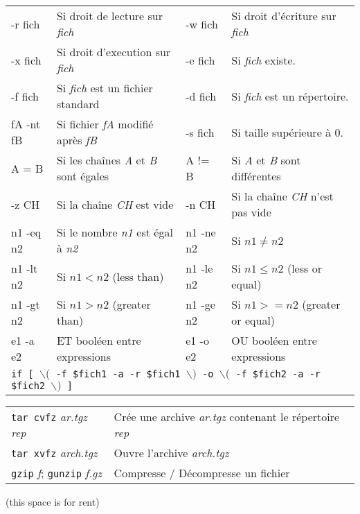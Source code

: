 \documentclass[a4paper,10pt,landscape,twocolumn]{article}
\newcommand{\Subsection}[1]{{\textbf{#1}}}
\begin{document}
\begin{tabular}{|p{13mm}|p{48mm}|p{13mm}|p{48mm}|}\hline
-r fich & Si droit de lecture sur \textit{fich} &
-w fich & Si droit d'écriture sur \textit{fich}\\
-x fich & Si droit d'execution sur \textit{fich} &
-e fich & Si \textit{fich} existe.\\
-f fich & Si \textit{fich} est un fichier standard&
-d fich & Si \textit{fich} est un répertoire.\\
{\small fA -nt fB} & Si fichier \textit{fA} modifié après \textit{fB}&
-s fich & Si taille supérieure à 0.\\\hline

A = B  & Si les chaînes \textit{A} et \textit{B} sont égales & 
A != B & Si \textit{A} et \textit{B} sont différentes \\
-z CH & Si la chaîne \textit{CH} est vide & -n CH & Si la chaîne \textit{CH} n'est pas vide\\\hline

{\small n1 -eq n2} & Si le nombre \textit{n1} est égal à \textit{n2}&
{\small n1 -ne n2} & Si $n1 \ne n2$\\
{\small n1 -lt n2} & Si $n1 < n2$ (less than)& 
{\small n1 -le n2} & Si $n1 \le n2$ (less or equal)\\
{\small n1 -gt n2} & Si $n1 > n2$ (greater than)&
{\small n1 -ge n2} & Si $n1 >= n2$ (greater or equal)\\\hline
{\small e1 -a e2}  & ET booléen entre expressions& 
{\small e1 -o e2}  & OU booléen entre expressions\\\hline

\multicolumn{4}{|l|}{\texttt{if [ $\backslash($ -f \$fich1 -a -r \$fich1 $\backslash)$ -o  $\backslash($ -f \$fich2 -a -r \$fich2 $\backslash)$ ] }}\\\hline
\end{tabular}

\medskip\Subsection{Gestion d'archives}

\begin{tabular}{|p{32mm}|p{10cm}|}\hline
{\small \texttt{tar cvfz} \textit{ar.tgz} \textit{rep}} & Crée une archive \textit{ar.tgz}
contenant le répertoire \textit{rep}\\
\texttt{tar xvfz} \textit{arch.tgz} & Ouvre l'archive \textit{arch.tgz}\\\hline

\texttt{gzip} \textit{f}; \texttt{gunzip} \textit{f.gz} & Compresse / Décompresse un fichier\\\hline
\end{tabular}

\vfill
\hfill(this space is for rent)
\end{document}
